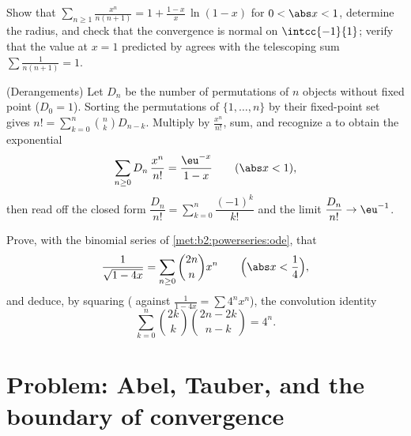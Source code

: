 \begin{exercise}[$\star$]\label{exo:b2:powerseries:10}
Show that $\displaystyle\sum_{n\geq1}\frac{x^n}{n(n+1)} = 1 +
\frac{1-x}{x}\,\ln(1-x)$ for $0 < \abs x < 1$, determine the
radius, and check that the convergence is normal on
$\intcc{-1}{1}$; verify that the value at $x = 1$ predicted by
 agrees with the telescoping sum $\sum
\frac{1}{n(n+1)} = 1$.
\end{exercise}

\begin{exercise}[$\star\star$]\label{exo:b2:powerseries:11}
(Derangements) Let $D_n$ be the number of permutations of $n$
objects without fixed point ($D_0 = 1$). Sorting the
permutations of $\{1, \dots, n\}$ by their fixed-point set gives
$n! = \sum_{k=0}^{n}\binom nk D_{n-k}$. Multiply by
$\frac{x^n}{n!}$, sum, and recognize a  to obtain
the exponential 
\[
\sum_{n\geq0} D_n\,\frac{x^n}{n!} = \frac{\eu^{-x}}{1-x}
\qquad (\abs x < 1),
\]
then read off the closed form $\dfrac{D_n}{n!} =
\sum_{k=0}^{n}\dfrac{(-1)^k}{k!}$ and the limit $\dfrac{D_n}{n!}
\to \eu^{-1}$.
\end{exercise}

\begin{exercise}[$\star\star\star$]\label{exo:b2:powerseries:12}
Prove, with the binomial series of
\cref{met:b2:powerseries:ode}, that
\[
\frac{1}{\sqrt{1 - 4x}} = \sum_{n\geq0}\binom{2n}{n}x^n
\qquad \Bigl(\abs x < \frac14\Bigr),
\]
and deduce, by squaring ( against
$\frac{1}{1-4x} = \sum 4^nx^n$), the convolution identity
\[
\sum_{k=0}^{n}\binom{2k}{k}\binom{2n-2k}{n-k} = 4^n .
\]
\end{exercise}

\section{Problem: Abel, Tauber, and the boundary of convergence}

